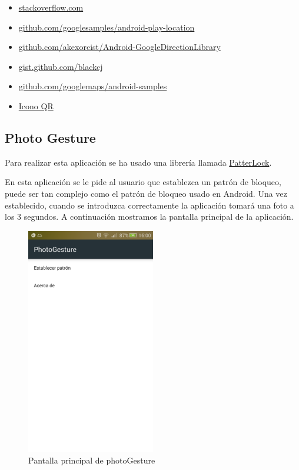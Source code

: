 \documentclass[	DIV=calc,%
							paper=a4,%
							fontsize=11pt]{scrartcl}	 					%
\begin{document}
\begin{itemize}
\itemsep1pt\parskip0pt
\item
  \href{http://stackoverflow.com/a/14695943/1612432}{stackoverflow.com}
\item
  \href{https://github.com/googlesamples/android-play-location/tree/master/LocationUpdates}{github.com/googlesamples/android-play-location}
\item
  \href{https://github.com/akexorcist/Android-GoogleDirectionLibrary}{github.com/akexorcist/Android-GoogleDirectionLibrary}
\item
  \href{https://gist.github.com/blackcj/20efe2ac885c7297a676\#gistcomment-1666537}{gist.github.com/blackcj}
\item
  \href{https://github.com/googlemaps/android-samples}{github.com/googlemaps/android-samples}
\item
  \href{http://www.iconarchive.com/show/windows-8-icons-by-icons8/Ecommerce-Qr-Code-icon.html}{Icono
  QR}
\end{itemize}

\subsection{Photo Gesture}\label{photo-gesture}

Para realizar esta aplicación se ha usado una librería llamada
\href{https://github.com/DreaminginCodeZH/PatternLock}{PatterLock}.

En esta aplicación se le pide al usuario que establezca un patrón de
bloqueo, puede ser tan complejo como el patrón de bloqueo usado en
Android. Una vez establecido, cuando se introduzca correctamente la
aplicación tomará una foto a los 3 segundos. A continuación mostramos la
pantalla principal de la aplicación.

\begin{figure}[H]
\centering
\includegraphics[width=0.5\textwidth]{./img/photoGesture.png}
\caption{Pantalla principal de photoGesture}
\end{figure}
\end{document}
